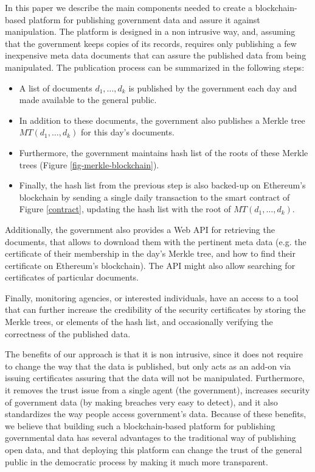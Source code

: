 In this paper we describe the main components needed to create a blockchain-based platform for publishing government data and assure it against manipulation. The platform is designed in a non intrusive way, and, assuming that the government keeps copies of its records, requires only publishing a few inexpensive meta data documents that can assure the published data from being manipulated. The publication process can be summarized in the following steps:
\begin{itemize}
\item A list of documents $d_1,\ldots ,d_k$ is published by the government each day and made available to the general public.
\item In addition to these documents, the government also publishes a Merkle tree $MT(d_1,\ldots ,d_k)$ for this day's documents.
\item Furthermore, the government maintains hash list of the roots of these Merkle trees (Figure \ref{fig-merkle-blockchain}).
\item Finally, the hash list from the previous step is also backed-up on Ethereum's blockchain by sending a single daily transaction to the smart contract of Figure \ref{contract}, updating the hash list with the root of $MT(d_1,\ldots ,d_k)$.
\end{itemize}

Additionally, the government also provides a Web API for retrieving the documents, that allows to download them with the pertinent meta data (e.g. the certificate of their membership in the day's Merkle tree, and how to find their certificate on Ethereum's blockchain). The API might also allow searching for certificates of particular documents.

Finally, monitoring agencies, or interested individuals, have an access to a tool that can further increase the credibility of the security certificates by storing the Merkle trees, or elements of the hash list, and occasionally verifying the correctness of the published data.

The benefits of our approach is that it is non intrusive, since it does not require to change the way that the data is published, but only acts as an add-on via issuing certificates assuring that the data will not be manipulated. Furthermore, it removes the trust issue from a single agent (the government), increases security of government data (by making breaches very easy to detect), and it also standardizes the way people access government's data. Because of these benefits, we believe that building such a blockchain-based platform for publishing governmental data has several advantages to the traditional way of publishing open data, and that deploying this platform can change the trust of the general public in the democratic process by making it much more transparent.